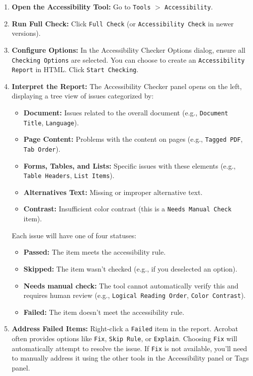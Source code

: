\begin{enumerate}

\item \textbf{Open the Accessibility Tool:} Go to \texttt{Tools} $>$ \texttt{Accessibility}.

\item \textbf{Run Full Check:} Click \texttt{Full Check} (or \texttt{Accessibility Check} in newer versions).

\item \textbf{Configure Options:} In the Accessibility Checker Options dialog, ensure all \texttt{Checking Options} are selected. You can choose to create an \texttt{Accessibility Report} in HTML. Click \texttt{Start Checking}.

\item \textbf{Interpret the Report:} The Accessibility Checker panel opens on the left, displaying a tree view of issues categorized by:
    \begin{itemize}
    \item \textbf{Document:} Issues related to the overall document (e.g., \texttt{Document Title}, \texttt{Language}).
    \item \textbf{Page Content:} Problems with the content on pages (e.g., \texttt{Tagged PDF}, \texttt{Tab Order}).
    \item \textbf{Forms, Tables, and Lists:} Specific issues with these elements (e.g., \texttt{Table Headers}, \texttt{List Items}).
    \item \textbf{Alternatives Text:} Missing or improper alternative text.
    \item \textbf{Contrast:} Insufficient color contrast (this is a \texttt{Needs Manual Check} item).
    \end{itemize}
    Each issue will have one of four statuses: \cite{AdobeAccessGuide}
    \begin{itemize}
    \item \textbf{Passed:} The item meets the accessibility rule.
    \item \textbf{Skipped:} The item wasn't checked (e.g., if you deselected an option).
    \item \textbf{Needs manual check:} The tool cannot automatically verify this and requires human review (e.g., \texttt{Logical Reading Order}, \texttt{Color Contrast}).
    \item \textbf{Failed:} The item doesn't meet the accessibility rule.
    \end{itemize}

\item \textbf{Address Failed Items:} Right-click a \texttt{Failed} item in the report. Acrobat often provides options like \texttt{Fix}, \texttt{Skip Rule}, or \texttt{Explain}. Choosing \texttt{Fix} will automatically attempt to resolve the issue. If \texttt{Fix} is not available, you'll need to manually address it using the other tools in the Accessibility panel or Tags panel.

\end{enumerate}

